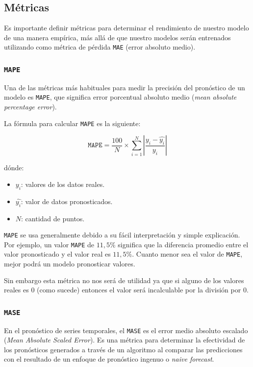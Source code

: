 \documentclass[a4paper,12pt]{article}
\begin{document}
\subsection{Métricas}

Es importante definir métricas para determinar el rendimiento de nuestro modelo de una manera empírica, más allá de que nuestro modelos serán entrenados utilizando como métrica de pérdida \texttt{MAE} (error absoluto medio).

\subsubsection{\texttt{MAPE}}

Una de las métricas más habituales para medir la precisión del pronóstico de un modelo es \texttt{MAPE}, que significa error porcentual absoluto medio (\textit{mean absolute percentage error}). \citep{MAPE}

La fórmula para calcular \texttt{MAPE} es la siguiente:

$$ \texttt{MAPE} = \frac{100}{N} \times \sum_{i=1}^{N} |\frac{y_i - \hat{y_i}}{y_i}| $$

dónde:

\begin{itemize}[noitemsep, topsep=2pt]
	\item $ y_i$: valores de los datos reales.
	\item $ \hat{y_i}$: valor de datos pronosticados.
	\item $ N $: cantidad de puntos.
\end{itemize}

\texttt{MAPE} se usa generalmente debido a su fácil interpretación y simple explicación. Por ejemplo, un valor \texttt{MAPE} de $11,5\%$ significa que la diferencia promedio entre el valor pronosticado y el valor real es $11,5\%$. Cuanto menor sea el valor de \texttt{MAPE}, mejor podrá un modelo pronosticar valores.

Sin embargo esta métrica no nos será de utilidad ya que si alguno de los valores reales es $0$ (como sucede) entonces el valor será incalculable por la división por $0$. 

\subsubsection{\texttt{MASE}}
En el pronóstico de series temporales, el \texttt{MASE} es el error medio absoluto escalado (\textit{Mean Absolute Scaled Error}). Es una métrica para determinar la efectividad de los pronósticos generados a través de un algoritmo al comparar las predicciones con el resultado de un enfoque de pronóstico ingenuo o \textit{naive forecast}. \citep{MASE}
\end{document}
